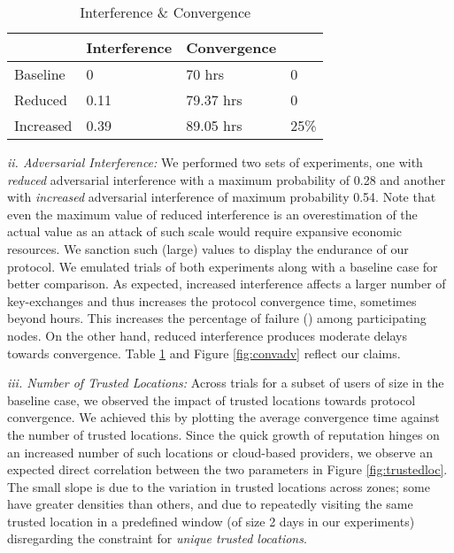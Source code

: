 \documentclass[letterpaper,twocolumn]{sig-alternate}
\begin{document}
\begin{table}[h]
\centering
\begin{tabular}{| l | l | l | l |}
\hline 
\textbf{} & \small{\textbf{Interference}} & \small{\textbf{Convergence}} & \small{\textbf{}}\\ 
\hline
 Baseline & 0 & 70 hrs & 0\\ 
 \hline
 Reduced & 0.11 & 79.37 hrs & 0\\ 
 \hline
 Increased & 0.39 & 89.05 hrs & 25\%\\ 
 \hline
\end{tabular}
\caption {Interference \& Convergence}
\label{table:adv}
\end{table}


\vspace{1mm}
{\em ii. Adversarial Interference:} We performed two sets of experiments, one with {\em reduced} adversarial interference with a maximum probability of 0.28 and another with {\em increased} adversarial interference of maximum probability 0.54. Note that even the maximum value of reduced interference is an overestimation of the actual value as an attack of such scale would require expansive economic resources. We sanction such (large) values to display the endurance of our protocol. We emulated  trials of both experiments along with a baseline case for better comparison. As expected, increased interference affects a larger number of key-exchanges and thus increases the protocol convergence time, sometimes beyond  hours. This increases the percentage of failure () among participating nodes. On the other hand, reduced interference produces moderate delays towards convergence. Table \ref{table:adv} and Figure \ref{fig:convadv} reflect our claims.  

\vspace{1mm}
{\em iii. Number of Trusted Locations:} Across  trials for a subset of users of size  in the baseline case, we observed the impact of trusted locations towards protocol convergence. We achieved this by plotting the average convergence time against the number of trusted locations. Since the quick growth of reputation hinges on an increased number of such locations or cloud-based providers, we observe an expected direct correlation between the two parameters in Figure \ref{fig:trustedloc}. The small slope is due to the variation in trusted locations across zones; some have greater densities than others, and due to repeatedly visiting the same trusted location in a predefined window (of size 2 days in our experiments) disregarding the constraint for {\em unique trusted locations}.
\end{document}
